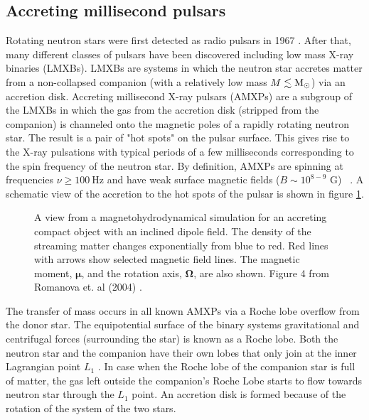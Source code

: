 \documentclass{wihuri}
\def\msun{{\rm M_{\odot}}}
\newcommand{\bmath}[1]{\boldsymbol{#1}}
\begin{document}


\subsection{Accreting millisecond pulsars}






Rotating neutron stars were first detected as radio pulsars in 1967 \cite{gold68}. %
After that, many different classes of pulsars have been discovered including low mass X-ray binaries (LMXBs). LMXBs are systems in which the neutron star accretes matter from a non-collapsed companion (with a relatively low mass $M \lesssim \msun$) via an accretion disk. Accreting millisecond X-ray pulsars (AMXPs) are a subgroup of the LMXBs in which the gas from the accretion disk (stripped from the companion) is channeled onto the magnetic poles of a rapidly rotating neutron star. The result is a pair of "hot spots" on the pulsar surface.  This gives rise to the X-ray pulsations with typical periods of a few milliseconds corresponding to the spin frequency of the neutron star. By definition, AMXPs are spinning at frequencies $\nu \ge 100 ~\mathrm{Hz}$ and have weak surface magnetic fields ($B \sim 10^{8-9}$ G) ~\cite{patruno}. A schematic view of the accretion to the hot spots of the pulsar is shown in figure \ref{fig:shcematic}.


\begin{figure}
\centerline{} 
\caption{A view from a magnetohydrodynamical simulation for an accreting compact object with an inclined dipole field. The density of the streaming matter changes exponentially from blue to red. Red lines with arrows show selected magnetic field lines. The magnetic moment, $\bmath{\mu}$, and the rotation axis, $\bmath{\Omega}$, are also shown. Figure 4 from Romanova et. al (2004) \cite{romanova}.} 
\label{fig:shcematic}
\end{figure}

The transfer of mass occurs in all known AMXPs via a Roche lobe overflow from the donor star. The equipotential surface of the binary systems gravitational and centrifugal forces (surrounding the star) is known as a Roche lobe. Both the neutron star and the companion have their own lobes that only join at the inner Lagrangian point $L_{1}$ \cite{frank85}. %
In case when the Roche lobe of the companion star is full of matter, the gas left outside the companion's Roche Lobe starts to flow towards neutron star through the  $L_{1}$ point. An accretion disk is formed because of the rotation of the system of the two stars.
 
\end{document}
